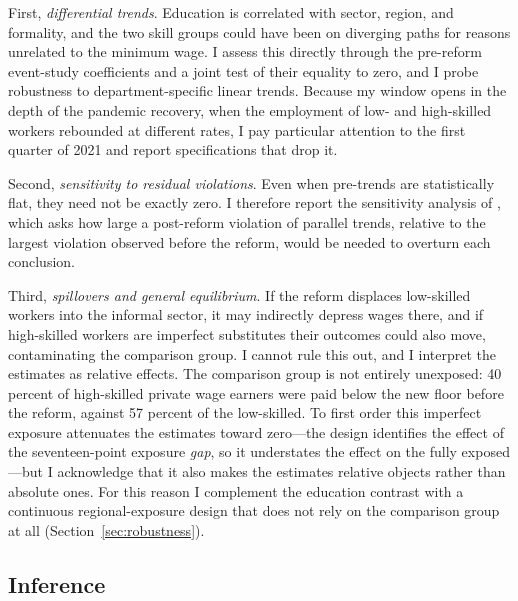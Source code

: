 First, \emph{differential trends}. Education is correlated with sector, region, and formality,
and the two skill groups could have been on diverging paths for reasons unrelated to the
minimum wage. I assess this directly through the pre-reform event-study coefficients and a
joint test of their equality to zero, and I probe robustness to department-specific linear
trends. Because my window opens in the depth of the pandemic recovery, when the employment of
low- and high-skilled workers rebounded at different rates, I pay particular attention to the
first quarter of 2021 and report specifications that drop it.

Second, \emph{sensitivity to residual violations}. Even when pre-trends are statistically flat,
they need not be exactly zero. I therefore report the sensitivity analysis of
\citet{rambachan_roth_2023}, which asks how large a post-reform violation of parallel trends,
relative to the largest violation observed before the reform, would be needed to overturn each
conclusion.

Third, \emph{spillovers and general equilibrium}. If the reform displaces low-skilled workers
into the informal sector, it may indirectly depress wages there, and if high-skilled workers are
imperfect substitutes their outcomes could also move, contaminating the comparison group. I
cannot rule this out, and I interpret the estimates as relative effects. The comparison group is
not entirely unexposed: 40 percent of high-skilled private wage earners were paid below the new
floor before the reform, against 57 percent of the low-skilled. To first order this imperfect
exposure attenuates the estimates toward zero---the design identifies the effect of the
seventeen-point exposure \emph{gap}, so it understates the effect on the fully exposed---but I
acknowledge that it also makes the estimates relative objects rather than absolute ones. For
this reason I complement the education contrast with a continuous regional-exposure design
that does not rely on the comparison group at all (Section~\ref{sec:robustness}).

\subsection{Inference}

